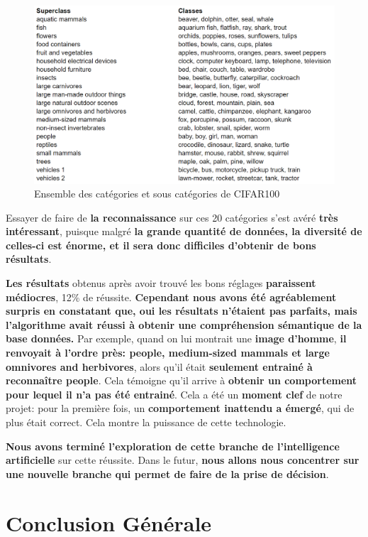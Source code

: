 \documentclass[12pt,a4paper]{extarticle}
\begin{document}
\begin{figure}[h]
\centering
\includegraphics[width=14.5cm]{categorie_CIFAR100}
\caption{Ensemble des catégories et sous catégories de CIFAR100}
\end{figure}

Essayer de faire de \textbf{la reconnaissance} sur ces 20 catégories s'est avéré \textbf{très intéressant}, puisque malgré \textbf{la grande quantité de données, la diversité de celles-ci est énorme, et il sera donc difficiles d'obtenir de bons résultats}.

\textbf{Les résultats} obtenus après avoir trouvé les bons réglages \textbf{paraissent médiocres}, 12\% de réussite. \textbf{Cependant nous avons été agréablement surpris en constatant que, oui les résultats n'étaient pas parfaits, mais l'algorithme avait réussi à obtenir une compréhension sémantique de la base données.} Par exemple, quand on lui montrait une \textbf{image d'homme}, \textbf{il renvoyait à l'ordre près: people, medium-sized mammals et large omnivores and herbivores}, alors qu'il était \textbf{seulement entrainé à reconnaître people}. Cela témoigne qu'il arrive à \textbf{obtenir un comportement pour lequel il n'a pas été entrainé}. Cela a été un \textbf{moment clef} de notre projet: pour la première fois, un \textbf{comportement inattendu a émergé}, qui de plus était correct. Cela montre la puissance de cette technologie. 

\textbf{Nous avons terminé l'exploration de cette branche de l'intelligence artificielle} sur cette réussite. Dans le futur,\textbf{ nous allons nous concentrer sur une nouvelle branche qui permet de faire de la prise de décision}.

\part{Conclusion Générale}
\end{document}
